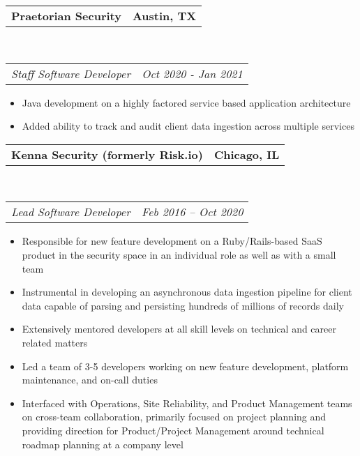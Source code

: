 \documentclass[10pt,letterpaper]{article}
\makeatletter
\newcommand{\headerrow}[2]
{\begin{tabular*}{\linewidth}{l@{\extracolsep{\fill}}r}
  #1 &
  #2 \\
\end{tabular*}}
\newenvironment{indentsection}[1]%
{\begin{list}{}%
  {\setlength{\leftmargin}{#1}}%
  \item[]%
}
{\end{list}}
\makeatother
\begin{document}
\begin{indentsection}{\parindent}
  \headerrow
    {\textbf{Praetorian Security} }
    {\textbf{Austin, TX}}
  \\
  \headerrow
    {\emph{Staff Software Developer}}
    {\emph{Oct 2020 - Jan 2021}}

  \begin{itemize}
  \renewcommand{\labelitemi}{$-$}
  \vspace{-0.1in}
    \item Java development on a highly factored service based application architecture
    \item Added ability to track and audit client data ingestion across multiple services
  \end{itemize}
\end{indentsection}

\begin{indentsection}{\parindent}
  \headerrow
    {\textbf{Kenna Security (formerly Risk.io)} }
    {\textbf{Chicago, IL}}
  \\
  \headerrow
    {\emph{Lead Software Developer}}
    {\emph{Feb 2016 -- Oct 2020}}

  \begin{itemize}
  \renewcommand{\labelitemi}{$-$}
  \vspace{-0.1in}
    \item Responsible for new feature development on a Ruby/Rails-based SaaS product in the security space in an individual role as well as with a small team
    \item Instrumental in developing an asynchronous data ingestion pipeline for client data capable of parsing and persisting hundreds of millions of records daily
    \item Extensively mentored developers at all skill levels on technical and career related matters
    \item Led a team of 3-5 developers working on new feature development, platform maintenance, and on-call duties
    \item Interfaced with Operations, Site Reliability, and Product Management teams on cross-team collaboration, primarily focused on project planning and providing direction for Product/Project Management around technical roadmap planning at a company level
  \end{itemize}
\end{indentsection}
\end{document}

